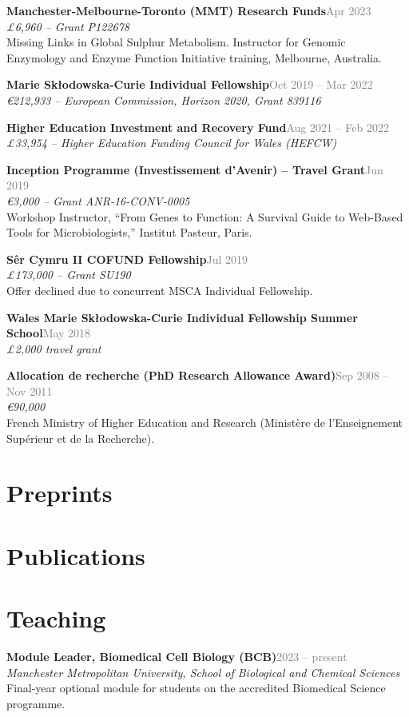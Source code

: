 \documentclass[10pt,a4paper]{article}
\newcommand{\cvdate}[1]{\textcolor{graytext}{\small #1}}
\newcommand{\cventry}[4]{%
  \noindent\textbf{#1}\hfill\cvdate{#2}\\
  \textit{#3}\\
  #4\par\vspace{0.4em}
}
\begin{document}
\cventry{Manchester-Melbourne-Toronto (MMT) Research Funds}{Apr 2023}
  {£6,960 -- Grant P122678}
  {Missing Links in Global Sulphur Metabolism. Instructor for Genomic Enzymology and Enzyme Function Initiative training, Melbourne, Australia.}

\cventry{Marie Skłodowska-Curie Individual Fellowship}{Oct 2019 -- Mar 2022}
  {€212,933 -- European Commission, Horizon 2020, Grant 839116}{}

\cventry{Higher Education Investment and Recovery Fund}{Aug 2021 -- Feb 2022}
  {£33,954 -- Higher Education Funding Council for Wales (HEFCW)}{}

\cventry{Inception Programme (Investissement d'Avenir) -- Travel Grant}{Jun 2019}
  {€3,000 -- Grant ANR-16-CONV-0005}
  {Workshop Instructor, ``From Genes to Function: A Survival Guide to Web-Based Tools for Microbiologists,'' Institut Pasteur, Paris.}

\cventry{Sêr Cymru II COFUND Fellowship}{Jul 2019}
  {£173,000 -- Grant SU190}
  {Offer declined due to concurrent MSCA Individual Fellowship.}

\cventry{Wales Marie Skłodowska-Curie Individual Fellowship Summer School}{May 2018}
  {£2,000 travel grant}{}

\cventry{Allocation de recherche (PhD Research Allowance Award)}{Sep 2008 -- Nov 2011}
  {€90,000}
  {French Ministry of Higher Education and Research (Ministère de l'Enseignement Supérieur et de la Recherche).}

\section*{Preprints}
\nocite{*}
\printbibliography[heading=none,keyword=preprint]

\section*{Publications}
\printbibliography[heading=none,notkeyword=preprint]

\section*{Teaching}

\cventry{Module Leader, Biomedical Cell Biology (BCB)}{2023 -- present}
  {Manchester Metropolitan University, School of Biological and Chemical Sciences}
  {Final-year optional module for students on the accredited Biomedical Science programme.}
\end{document}
